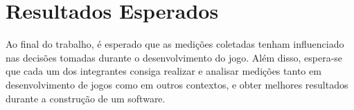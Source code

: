 \chapter{Resultados Esperados}
Ao final do trabalho, é esperado que as medições coletadas tenham influenciado nas decisões tomadas durante o desenvolvimento do jogo.
Além disso, espera-se que cada um dos integrantes consiga realizar e analisar medições tanto em desenvolvimento de jogos como em outros contextos, e obter melhores resultados durante a construção de um software.
